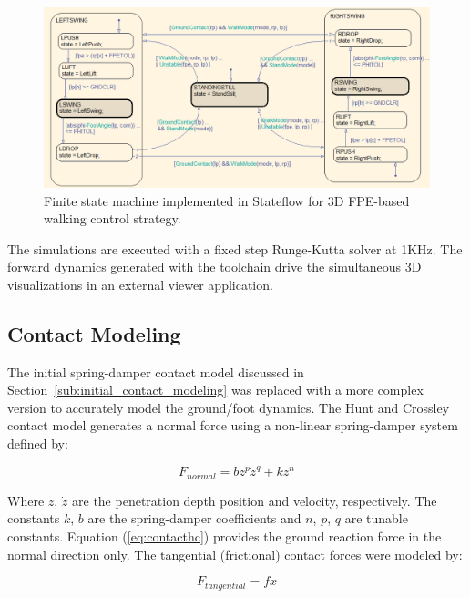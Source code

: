 \begin{figure}[!h]
	\centering
    \includegraphics[scale=0.6]{fig/simulations/stateflow.png} 
  	\caption{Finite state machine implemented in Stateflow for 3D FPE-based walking control strategy. \Incomplete}
	\label{fig:stateflow}
\end{figure}

The simulations are executed with a fixed step Runge-Kutta solver at 1KHz. The forward dynamics generated with the toolchain drive the simultaneous 3D visualizations in an external viewer application.  

\subsection{Contact Modeling} %
\label{sub:full_contact_modeling}
The initial spring-damper contact model discussed in Section~\ref{sub:initial_contact_modeling} was replaced with a more complex version to accurately model the ground/foot dynamics. The Hunt and Crossley contact model \cite{hunt1975coefficient,gilardi2002literature} generates a normal force using a non-linear spring-damper system defined by: 

\begin{equation}
	\label{eq:contacthc}
	{F_{normal}} = b{z^p}{\dot z^q} + k{z^n}
\end{equation}

Where $z$, $\dot{z}$ are the penetration depth position and velocity, respectively. The constants $k$, $b$ are the spring-damper coefficients and $n$, $p$, $q$ are tunable constants. Equation (\ref{eq:contacthc}) provides the ground reaction force in the normal direction only. The tangential (frictional) contact forces were modeled by: 


\begin{equation}
	\label{eq:contactfr}
	{F_{tangential}} = f{\dot x}
\end{equation}

